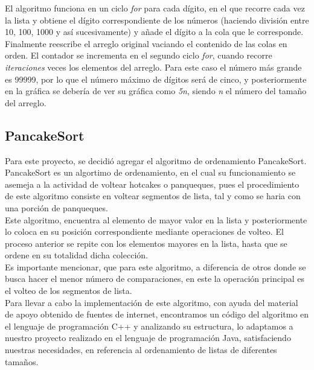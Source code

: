 \documentclass[a4paper,12pt]{article}
\begin{document}
El algoritmo funciona en un ciclo \textit{for} para cada dígito, en el que recorre cada vez la lista y obtiene el dígito correspondiente de los números (haciendo división entre 10, 100, 1000 y así sucesivamente) y añade el dígito a la cola que le corresponde. Finalmente reescribe el arreglo original vaciando el contenido de las colas en orden. El contador se incrementa en el segundo ciclo \textit{for}, cuando recorre \textit{iteraciones} veces los elementos del arreglo. Para este caso el número más grande es 99999, por lo que el número máximo de dígitos será de cinco, y posteriormente en la gráfica se debería de ver su gráfica como \textit{5n}, siendo \textit{n} el número del tamaño del arreglo.

\subsection{PancakeSort}

Para este proyecto, se decidió agregar el algoritmo de ordenamiento PancakeSort.\\

PancakeSort es un algortimo de ordenamiento, en el cual su funcionamiento se asemeja a la actividad de voltear hotcakes o panqueques, pues el procedimiento de este algoritmo consiste en voltear segmentos de lista, tal y como se haria con una porción de panqueques.\\

Este algoritmo, encuentra al elemento de mayor valor en la lista y posteriormente lo coloca en su posición correspondiente mediante operaciones de volteo. El proceso anterior se repite con los elementos mayores en la lista, hasta que se ordene en su totalidad dicha colección.\\

Es importante mencionar, que para este algoritmo, a diferencia de otros donde se busca hacer el menor número de comparaciones, en este la operación principal es el volteo de los segmentos de lista.\cite{ord-panq}\\

Para llevar a cabo la implementación de este algoritmo, con ayuda del material de apoyo obtenido de fuentes de internet\cite{gfg-2023}, encontramos un código del algoritmo en el lenguaje de programación C++ y analizando su estructura, lo adaptamos a nuestro proyecto realizado en el lenguaje de programación Java, satisfaciendo nuestras necesidades, en referencia al ordenamiento de listas de diferentes tamaños.\\
\end{document}
